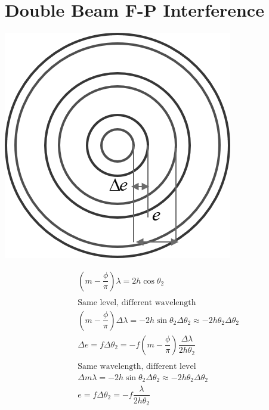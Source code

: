 \section{Double Beam F-P Interference}

\begin{minipage}[htbp]{0.4\linewidth}
  \includegraphics[width=\linewidth]{figures/double-beam-interference.png}
\end{minipage}
\begin{minipage}[htbp]{0.6\linewidth}
  \begin{equation*}
    \begin{aligned}
      & \left( m - \dfrac{\phi}{\pi}  \right) \lambda = 2 h \cos \theta_2 \\
      \\
      & \text{Same level, different wavelength} \\
      & \left( m - \dfrac{\phi}{\pi}  \right) \Delta \lambda = - 2 h \sin \theta_2 \Delta \theta_2 \approx - 2 h \theta_2 \Delta \theta_2 \\
      & \Delta e = f \Delta \theta_2 = - f \left( m - \dfrac{\phi}{\pi}  \right) \dfrac{\Delta \lambda}{2 h \theta_2} \\
      \\
      & \text{Same wavelength, different level} \\
      & \Delta m \lambda = - 2 h \sin \theta_2 \Delta \theta_2 \approx - 2 h \theta_2 \Delta \theta_2 \\
      & e = f \Delta \theta_2 = - f \dfrac{\lambda}{2 h \theta_2}  
    \end{aligned}
  \end{equation*}
\end{minipage}

